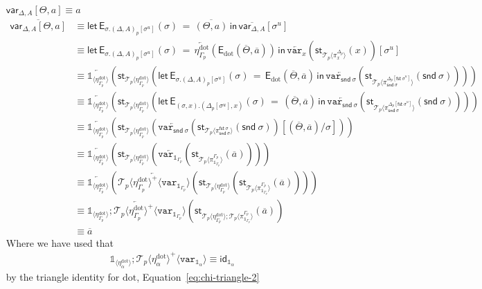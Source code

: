 \documentclass[10pt]{article}
\theoremstyle{definition}
\newcommand\dsd[1]{\ensuremath{\mathsf{#1}}}
\newcommand{\app}[2]{\ensuremath{#1 \: #2}}
\newcommand{\fst}[1]{\app{\dsd{fst}}{#1}}
\newcommand{\snd}[1]{\app{\dsd{snd}}{#1}}
\newcommand{\id}{\mathsf{id}}
\newcommand{\rewrite}[2]{\overleftarrow{#1}(#2)}
\newcommand\StI[2]{\ensuremath{\mathsf{st}_{#1}(#2)}}
\newcommand\EEs[4]{\ensuremath{\mathsf{let} \, \mathsf{E}_{#1}(#3) \, = \, {#2} \, \mathsf{in} \, #4}}
\newcommand\EIs[2]{\ensuremath{\mathsf{E}_{#1}{(#2)}}}
\newcommand\ApEl[2]{\mathcal{T}_{#1}\langle#2\rangle}
\newcommand\ApPlus[2]{\ensuremath{{#1}^+ \langle #2 \rangle }}
\newcommand\unp[2]{\ensuremath{{#2}^u}}
\newcommand{\modeof}[1]{{#1}_p}
\newcommand{\sdot}{\ensuremath{\mathrm{dot}}}
\newcommand{\upstairs}[1]{\overline{#1}}
\newcommand\qvar[1]{\ensuremath{\mathsf{var}_{#1}}}
\newcommand\One{\ensuremath{\mathds{1}}}
\newcommand\var[1]{\ensuremath{\mathtt{var}_{#1}}}
\newcommand\ApOne[1]{\ensuremath{\One_{\langle {#1} \rangle }}}
\begin{document}
\begin{enumerate}[style = multiline, labelwidth = 80pt]
\item[{$\qvar{\Delta,A}[\Theta, a] \equiv a$}]
\begin{align*}
\upstairs{\qvar{\Delta,A}[\Theta, a]}
&\equiv \EEs{\sigma.\modeof{(\Delta,A)}[\unp{\Delta,A}{\sigma}]}{\upstairs{(\Theta, a)}}{\sigma}{\upstairs{\qvar{\Delta,A}}[\unp{\Delta, x : A}{\sigma}]} \\
&\equiv \EEs{\sigma.\modeof{(\Delta,A)}[\unp{\Delta,A}{\sigma}]}{\rewrite{\eta^\sdot_{\modeof{\Gamma}}}{\EIs{\sdot}{\upstairs{\Theta}, \upstairs{a}}}}{\sigma}{\rewrite{\var{x}}{\StI{\ApEl{p}{\pi^{\modeof{\Delta}}_x}}{x}}[\unp{\Delta, A}{\sigma}]} \\
&\equiv \rewrite{\ApOne{\eta^\sdot_{\modeof{\Gamma}}}}{\StI{\ApEl{p}{\eta^\sdot_{\modeof{\Gamma}}}}{\EEs{\sigma.\modeof{(\Delta,A)}[\unp{\Delta,A}{\sigma}]}{\EIs{\sdot}{\upstairs{\Theta}, \upstairs{a}}}{\sigma}{\rewrite{\var{\snd \sigma}}{\StI{\ApEl{p}{\pi^{\modeof{\Delta}[\unp{\Delta}{\fst \sigma}]}_{\snd \sigma}}}{\snd \sigma}}}}} \\
&\equiv \rewrite{\ApOne{\eta^\sdot_{\modeof{\Gamma}}}}{\StI{\ApEl{p}{\eta^\sdot_{\modeof{\Gamma}}}}{\EEs{(\sigma, x). (\modeof{\Delta}[\unp{\Delta}{\sigma}], x)}{(\upstairs{\Theta}, \upstairs{a})}{\sigma}{\rewrite{\var{\snd \sigma}}{\StI{\ApEl{p}{\pi^{\modeof{\Delta}[\unp{\Delta}{\fst \sigma}]}_{\snd \sigma}}}{\snd \sigma}}}}} \\
&\equiv \rewrite{\ApOne{\eta^\sdot_{\modeof{\Gamma}}}}{\StI{\ApEl{p}{\eta^\sdot_{\modeof{\Gamma}}}}{\rewrite{\var{\snd \sigma}}{\StI{\ApEl{p}{\pi^{\fst \sigma}_{\snd \sigma}}}{\snd \sigma}}[(\upstairs{\Theta}, \upstairs{a})/\sigma]}} \\
&\equiv \rewrite{\ApOne{\eta^\sdot_{\modeof{\Gamma}}}}{\StI{\ApEl{p}{\eta^\sdot_{\modeof{\Gamma}}}}{\rewrite{\var{\One_{\modeof{\Gamma}}}}{\StI{\ApEl{p}{\pi^{\modeof{\Gamma}}_{\One_{\modeof{\Gamma}}}}}{\upstairs{a}}}}} \\
&\equiv \rewrite{\ApOne{\eta^\sdot_{\modeof{\Gamma}}}}{\rewrite{\ApPlus{\ApEl{p}{\eta^\sdot_{\modeof{\Gamma}}}}{\var{\One_{\modeof{\Gamma}}}}}{\StI{\ApEl{p}{\eta^\sdot_{\modeof{\Gamma}}}}{\StI{\ApEl{p}{\pi^{\modeof{\Gamma}}_{\One_{\modeof{\Gamma}}}}}{\upstairs{a}}}}} \\
&\equiv \rewrite{\ApOne{\eta^\sdot_{\modeof{\Gamma}}};\ApPlus{\ApEl{p}{\eta^\sdot_{\modeof{\Gamma}}}}{\var{\One_{\modeof{\Gamma}}}}}{\StI{\ApEl{p}{\eta^\sdot_{\modeof{\Gamma}}};\ApEl{p}{\pi^{\modeof{\Gamma}}_{\One_{\modeof{\Gamma}}}}}{\upstairs{a}}} \\
&\equiv \upstairs{a}
\end{align*}
Where we have used that
\begin{align*}
\ApOne{\eta^\sdot_\alpha};\ApPlus{\ApEl{p}{\eta^\sdot_\alpha}}{\var{\One_\alpha}} \equiv \id_{\One_\alpha}
\end{align*}
by the triangle identity for $\sdot$, Equation~\eqref{eq:chi-triangle-2}


\end{enumerate}
\end{document}
